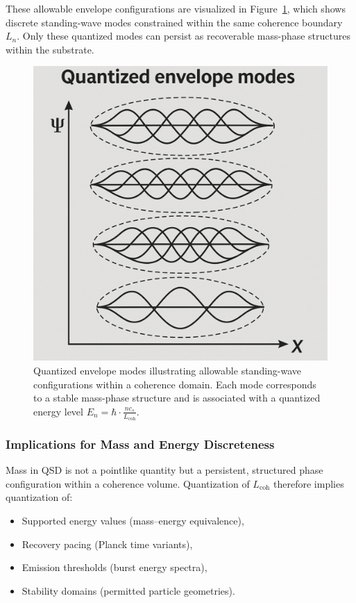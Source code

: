 \documentclass[entropy,article,submit,pdftex,moreauthors]{Definitions/mdpi}
\begin{document}
These allowable envelope configurations are visualized in Figure~\ref{fig:envelope_modes}, which shows discrete standing-wave modes constrained within the same coherence boundary $L_n$. Only these quantized modes can persist as recoverable mass-phase structures within the substrate.

\begin{figure}[H]
  \centering
  \includegraphics[width=0.65\linewidth]{figures/envelope.pdf}
  \caption{Quantized envelope modes illustrating allowable standing-wave configurations within a coherence domain. Each mode corresponds to a stable mass-phase structure and is associated with a quantized energy level $E_n = \hbar \cdot \frac{n c_s}{L_{\text{coh}}}$.}
  \label{fig:envelope_modes}
\end{figure}


\subsubsection{Implications for Mass and Energy Discreteness}

Mass in QSD is not a pointlike quantity but a persistent, structured phase configuration within a coherence volume. Quantization of $L_{\text{coh}}$ therefore implies quantization of:
\begin{itemize}
  \item Supported energy values (mass–energy equivalence),
  \item Recovery pacing (Planck time variants),
  \item Emission thresholds (burst energy spectra),
  \item Stability domains (permitted particle geometries).
\end{itemize}
\end{document}
